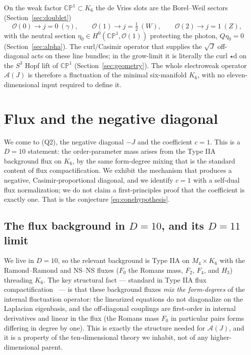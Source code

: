 \documentclass[11pt]{article}
\theoremstyle{plain}
\theoremstyle{definition}
\newcommand{\cA}{\mathcal{A}}
\newcommand{\cO}{\mathcal{O}}
\newcommand{\dd}{\mathrm{d}}
\begin{document}
On the weak factor $\mathbb{CP}^1\subset K_6$ the de Vries slots are the
Borel--Weil sectors (Section~\ref{sec:doublet})
\begin{equation}
\cO(0)\to j=0\ (\gamma),\qquad
\cO(1)\to j=\tfrac12\ (W),\qquad
\cO(2)\to j=1\ (Z),
\end{equation}
with the neutral section $\eta_0\in H^0(\mathbb{CP}^1,\cO(1))$ protecting the
photon, $Q\eta_0=0$ (Section~\ref{sec:alpha}). The curl/Casimir operator that
supplies the $\sqrt J$ off-diagonal acts on these line bundles; in the
grow-limit it is literally the curl $\star\dd$ on the $S^3$ Hopf lift of
$\mathbb{CP}^1$ (Section~\ref{sec:geometry}). The whole electroweak operator
$\cA(J)$ is therefore a fluctuation of the minimal six-manifold $K_6$, with no
eleven-dimensional input required to define it.

\section{Flux and the negative diagonal}
\label{sec:flux}

We come to (Q2), the negative diagonal $-J$ and the coefficient $c=1$. This
is a $D=10$ statement: the order-parameter mass arises from the Type IIA
background flux on $K_6$, by the same form-degree mixing that is the standard
content of flux compactification. We exhibit the mechanism that produces a
negative, Casimir-proportional diagonal, and we identify $c=1$ with a
self-dual flux normalization; we do not claim a first-principles proof that
the coefficient is exactly one. That is the conjecture
\eqref{eq:conehypothesis}.

\subsection{The flux background in $D=10$, and its $D=11$ limit}

We live in $D=10$, so the relevant background is Type IIA on $M_4\times K_6$
with the Ramond--Ramond and NS--NS fluxes ($F_0$ the Romans mass, $F_2$,
$F_4$, and $H_3$) threading $K_6$. The key structural fact --- standard in
Type IIA flux compactification~\cite{KoerberLustTsimpis2008} --- is
that these background fluxes \emph{mix the form-degrees} of the internal
fluctuation operator: the linearized equations do not diagonalize on the
Laplacian eigenbasis, and the off-diagonal couplings are first-order in
internal derivatives and linear in the flux (the Romans mass $F_0$ in
particular pairs forms differing in degree by one). This is exactly the structure
needed for $\cA(J)$, and it is a property of the ten-dimensional theory we
inhabit, not of any higher-dimensional parent.
\end{document}
